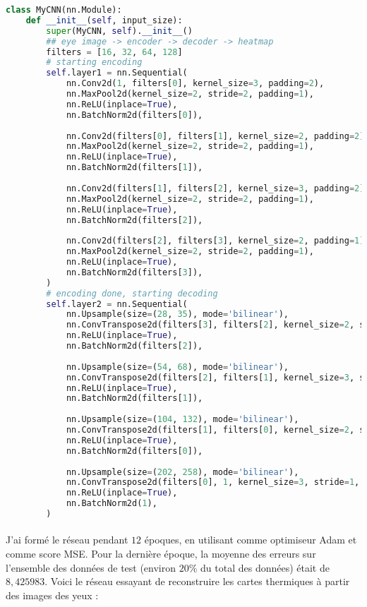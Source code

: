 \begin{lstlisting}[language=python]
class MyCNN(nn.Module):
    def __init__(self, input_size):
        super(MyCNN, self).__init__()
        ## eye image -> encoder -> decoder -> heatmap
        filters = [16, 32, 64, 128]
        # starting encoding
        self.layer1 = nn.Sequential(
            nn.Conv2d(1, filters[0], kernel_size=3, padding=2),
            nn.MaxPool2d(kernel_size=2, stride=2, padding=1),
            nn.ReLU(inplace=True),
            nn.BatchNorm2d(filters[0]),
            
            nn.Conv2d(filters[0], filters[1], kernel_size=2, padding=2),
            nn.MaxPool2d(kernel_size=2, stride=2, padding=1),
            nn.ReLU(inplace=True),
            nn.BatchNorm2d(filters[1]),
            
            nn.Conv2d(filters[1], filters[2], kernel_size=3, padding=2),
            nn.MaxPool2d(kernel_size=2, stride=2, padding=1),
            nn.ReLU(inplace=True),
            nn.BatchNorm2d(filters[2]),
            
            nn.Conv2d(filters[2], filters[3], kernel_size=2, padding=1),
            nn.MaxPool2d(kernel_size=2, stride=2, padding=1),
            nn.ReLU(inplace=True),
            nn.BatchNorm2d(filters[3]),
        )
        # encoding done, starting decoding
        self.layer2 = nn.Sequential(
            nn.Upsample(size=(28, 35), mode='bilinear'),
            nn.ConvTranspose2d(filters[3], filters[2], kernel_size=2, stride=1, padding=1),
            nn.ReLU(inplace=True),
            nn.BatchNorm2d(filters[2]),
            
            nn.Upsample(size=(54, 68), mode='bilinear'),
            nn.ConvTranspose2d(filters[2], filters[1], kernel_size=3, stride=1, padding=2),
            nn.ReLU(inplace=True),
            nn.BatchNorm2d(filters[1]),
            
            nn.Upsample(size=(104, 132), mode='bilinear'),
            nn.ConvTranspose2d(filters[1], filters[0], kernel_size=2, stride=1, padding=2),
            nn.ReLU(inplace=True),
            nn.BatchNorm2d(filters[0]),
        
            nn.Upsample(size=(202, 258), mode='bilinear'),
            nn.ConvTranspose2d(filters[0], 1, kernel_size=3, stride=1, padding=2),
            nn.ReLU(inplace=True),
            nn.BatchNorm2d(1),
        )
\end{lstlisting}

\paragraph{}
J'ai formé le réseau pendant $12$ époques, en utilisant comme optimiseur Adam et comme score MSE.
Pour la dernière époque, la moyenne des erreurs sur l'ensemble des données de test (environ $20\%$ du total des données) était de $8,425983$.
Voici le réseau essayant de reconstruire les cartes thermiques à partir des images des yeux :

